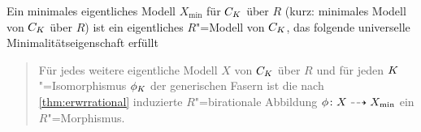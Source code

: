 \begin{Definition}
  Ein minimales eigentliches Modell $X_{\text{min}}$ für $C_{K}$ über
  $R$ (kurz: minimales Modell von $C_{K}$ über $R$) ist ein
  eigentliches $R$"=Modell von $C_{K}$, das folgende universelle
  Minimalitätseigenschaft erfüllt
  \begin{quote}
    Für jedes weitere eigentliche Modell $X$ von
    $C_{K}$ über $R$ und für jeden $K$"=Isomorphismus $\phi_{K}$ der
    generischen Fasern ist die nach \ref{thm:erwrrational}
    induzierte $R$"=birationale Abbildung $\phi\colon X\dashrightarrow
    X_{\text{min}}$ ein $R$"=Morphismus.
  \end{quote}
\end{Definition}


